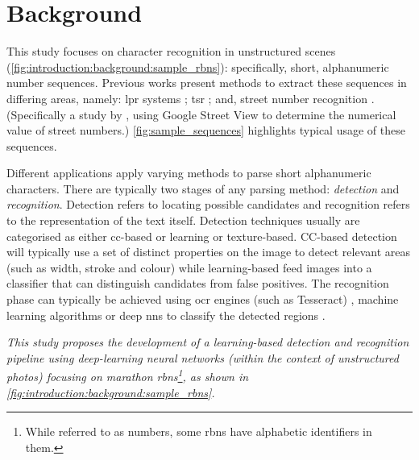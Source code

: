 \section{Background}
\label{sec:introduction:background}

This study focuses on character recognition in unstructured scenes (\cref{fig:introduction:background:sample_rbns}): specifically, short, alphanumeric number sequences. Previous works present methods to extract these sequences in differing areas, namely: \gls{lpr} systems \citep{CanoPerez:2003fq,Anagnostopoulos:2006wv}; \gls{tsr} \citep{Eichner:2008dw,Kundu:2015vq,Seo:2015ez, Lian:2016dc}; and, street number recognition \citep{Netzer:2011to}. (Specifically a study by \citeauthor{Netzer:2011to}, using Google Street View to determine the numerical value of street numbers.) \cref{fig:sample_sequences} highlights typical usage of these sequences.

Different applications apply varying methods to parse short alphanumeric characters. There are typically two stages of any parsing method: \textit{detection} and \textit{recognition}. Detection refers to locating possible candidates and recognition refers to the representation of the text itself. Detection techniques usually are categorised as either \gls{cc}-based or learning or texture-based. CC-based detection will typically use a set of distinct properties on the image to detect relevant areas (such as width, stroke and colour) while learning-based feed images into a classifier that can distinguish candidates from false positives. The recognition phase can typically be achieved using \gls{ocr} engines (such as Tesseract) \citep{Benami:2012jf}, machine learning algorithms \citep{Kundu:2015vq, Netzer:2011to, Lee:1994jz} or deep \glspl{nn} to classify the detected regions \citep{Sermanet:2011ui, Lian:2016dc, Jin:2014jn}.

{
  \itshape
  This study proposes the development of a learning-based detection and recognition pipeline using deep-learning neural networks (within the context of unstructured photos) focusing on marathon \glspl{rbn}\footnote{While referred to as numbers, some \glspl{rbn} have alphabetic identifiers in them.}, as shown in \cref{fig:introduction:background:sample_rbns}.
}

